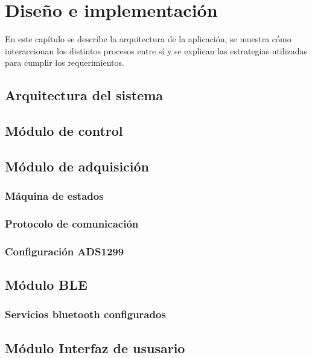 \chapter{Diseño e implementación} %

\label{Chapter3} %


En este capítulo se describe la arquitectura de la aplicación, se muestra cómo interaccionan los distintos procesos entre sí y se explican las estrategias utilizadas para cumplir los requerimientos.


\section{Arquitectura del sistema}

\section{Módulo de control}

\section{Módulo de adquisición}
\subsection{Máquina de estados}
\subsection{Protocolo de comunicación}
\subsection{Configuración ADS1299}

\section{Módulo BLE}
\subsection{Servicios bluetooth configurados}

\section{Módulo Interfaz de ususario}

